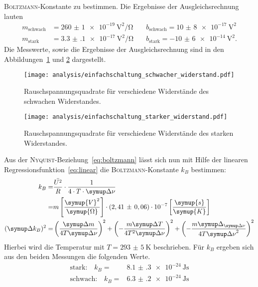\textsc{Boltzmann}-Konstante zu bestimmen. Die Ergebnisse der Ausgleichsrechnung
lauten
\begin{align*}
  m_\text{schwach}&=\SI{260(1)e-19}{\volt\squared\per\ohm} \quad &b_\text{schwach}=\SI{10(8)e-17}{\volt\squared} \\ m_\text{stark}&=\SI{3.3(1)e-17}{\volt\squared\per\ohm} \quad &b_\text{stark}=\SI{-10(6)e-14}{\volt\squared}.
\end{align*}
%
Die Messwerte, sowie die Ergebnisse der Ausgleichsrechnung sind in den Abbildungen~\ref{fig:r_schwach} und \ref{fig:r_stark} dargestellt.
%
\begin{figure}
  \centering
  \texttt{[image: analysis/einfachschaltung\_schwacher\_widerstand.pdf]}
  \caption{Rauschspannungsquadrate für verschiedene Widerstände des schwachen Widerstandes.}
  \label{fig:r_schwach}
\end{figure}
%
%
\begin{figure}
  \centering
  \texttt{[image: analysis/einfachschaltung\_starker\_widerstand.pdf]}
  \caption{Rauschspannungsquadrate für verschiedene Widerstände des starken Widerstandes.}
  \label{fig:r_stark}
\end{figure}
%

Aus der \textsc{Nyquist}-Beziehung~\eqref{eq:boltzmann} lässt sich nun mit Hilfe der linearen Regressionsfunktion~\ref{eq:linear}
 die \textsc{Boltzmann}-Konstante $k_B$ bestimmen:
%
\begin{align}
  k_B=&\frac{\bar{U^2}}{R}\cdot\frac{1}{4\cdot T\cdot\upD\nu} \\
     \nonumber=&m\left[\frac{\symup{V}^2}{\symup{\Omega}}\right]\cdot(2,41\,\pm\,0,06)\cdot10^{-7}\left[\frac{\symup{s}}{\symup{K}}\right] \\
  (\upD k_B)^2=&\left(\frac{\upD m}{4T\upD\nu}\right)^2+\left(-\frac{m\upD T}{4T^2\upD\nu}\right)^2+\left(-\frac{m\upD_{\upD\nu}}{4T{\upD\nu}^2}\right)^2
  \label{eq:k}
\end{align}
%
Hierbei wird die Temperatur mit $T=\SI{293(5)}{\kelvin}$ beschrieben. Für $k_{B}$ ergeben sich aus den beiden Messungen die folgenden Werte.
%
\begin{align}
  \text{stark:}\quad k_{B}=&\SI{8.1(3)e-24}{\joule\second} \\
  \text{schwach:}\quad k_{B}=&\SI{6.3(2)e-24}{\joule\second}
\end{align}
%
